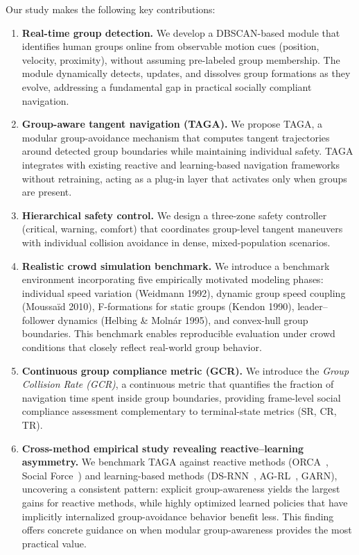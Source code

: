 Our study makes the following key contributions:

\begin{enumerate}
    \item \textbf{Real-time group detection.}
    We develop a DBSCAN-based module that identifies human groups online from observable motion cues (position, velocity, proximity), without assuming pre-labeled group membership.
    The module dynamically detects, updates, and dissolves group formations as they evolve, addressing a fundamental gap in practical socially compliant navigation.

    \item \textbf{Group-aware tangent navigation (TAGA).}
    We propose TAGA, a modular group-avoidance mechanism that computes tangent trajectories around detected group boundaries while maintaining individual safety.
    TAGA integrates with existing reactive and learning-based navigation frameworks without retraining, acting as a plug-in layer that activates only when groups are present.

    \item \textbf{Hierarchical safety control.}
    We design a three-zone safety controller (critical, warning, comfort) that coordinates group-level tangent maneuvers with individual collision avoidance in dense, mixed-population scenarios.

    \item \textbf{Realistic crowd simulation benchmark.}
    We introduce a benchmark environment incorporating five empirically motivated modeling phases: individual speed variation (Weidmann 1992), dynamic group speed coupling (Moussaïd 2010), F-formations for static groups (Kendon 1990), leader--follower dynamics (Helbing \& Molnár 1995), and convex-hull group boundaries.
    This benchmark enables reproducible evaluation under crowd conditions that closely reflect real-world group behavior.

    \item \textbf{Continuous group compliance metric (GCR).}
    We introduce the \textit{Group Collision Rate (GCR)}, a continuous metric that quantifies the fraction of navigation time spent inside group boundaries, providing frame-level social compliance assessment complementary to terminal-state metrics (SR, CR, TR).

    \item \textbf{Cross-method empirical study revealing reactive--learning asymmetry.}
    We benchmark TAGA against reactive methods (ORCA~\cite{orca}, Social Force~\cite{helbing1995social}) and learning-based methods (DS-RNN~\cite{liu2020decentralized}, AG-RL~\cite{liu2023intention}, GARN), uncovering a consistent pattern: explicit group-awareness yields the largest gains for reactive methods, while highly optimized learned policies that have implicitly internalized group-avoidance behavior benefit less.
    This finding offers concrete guidance on when modular group-awareness provides the most practical value.
\end{enumerate}

